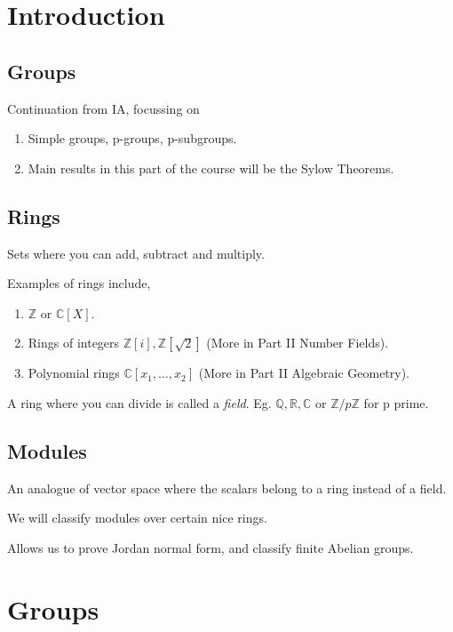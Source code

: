 \section{Introduction}
\subsection{Groups}
Continuation from IA, focussing on
\begin{enumerate}
    \item Simple groups, p-groups, p-subgroups.
    \item Main results in this part of the course will be the Sylow Theorems.
\end{enumerate}
\subsection{Rings}
Sets where you can add, subtract and multiply.

\begin{eg}
    Examples of rings include,
    \begin{enumerate}
        \item \(\mathbb{Z}\) or \(\mathbb{C}[X]\).
        \item Rings of integers \(\mathbb{Z}[i], \mathbb{Z}[\sqrt{2} ]\)  (More in Part II Number Fields).
        \item Polynomial rings \(\mathbb{C}[x_1, \ldots , x_2 ]\) (More in Part II Algebraic Geometry).
    \end{enumerate}
\end{eg}

A ring where you can divide is called a \textit{field}.
Eg. \(\mathbb{Q},\mathbb{R},\mathbb{C}\) or \(\mathbb{Z} / p\mathbb{Z}\) for p prime.

\subsection{Modules}
An analogue of vector space where the scalars belong to a ring instead of a field.

We will classify modules over certain nice rings.

Allows us to prove Jordan normal form, and classify finite Abelian groups.

\section{Groups}

